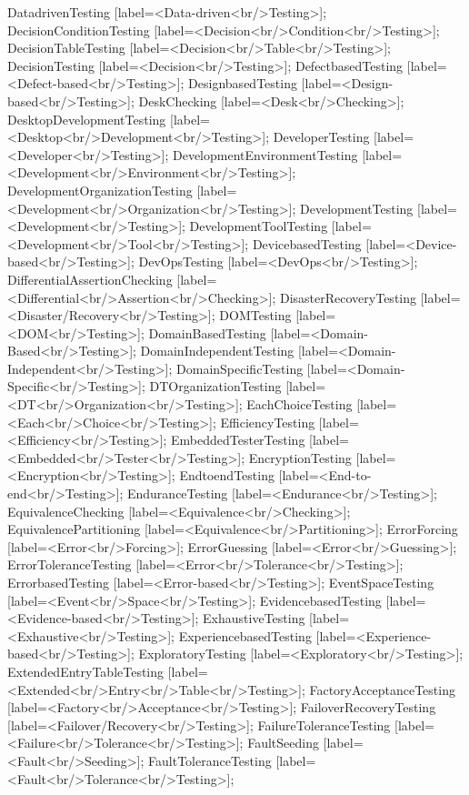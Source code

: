 \documentclass{article}
\begin{document}
{DatadrivenTesting [label=<Data-driven<br/>Testing>];
DecisionConditionTesting [label=<Decision<br/>Condition<br/>Testing>];
DecisionTableTesting [label=<Decision<br/>Table<br/>Testing>];
DecisionTesting [label=<Decision<br/>Testing>];
DefectbasedTesting [label=<Defect-based<br/>Testing>];
DesignbasedTesting [label=<Design-based<br/>Testing>];
DeskChecking [label=<Desk<br/>Checking>];
DesktopDevelopmentTesting [label=<Desktop<br/>Development<br/>Testing>];
DeveloperTesting [label=<Developer<br/>Testing>];
DevelopmentEnvironmentTesting [label=<Development<br/>Environment<br/>Testing>];
DevelopmentOrganizationTesting [label=<Development<br/>Organization<br/>Testing>];
DevelopmentTesting [label=<Development<br/>Testing>];
DevelopmentToolTesting [label=<Development<br/>Tool<br/>Testing>];
DevicebasedTesting [label=<Device-based<br/>Testing>];
DevOpsTesting [label=<DevOps<br/>Testing>];
DifferentialAssertionChecking [label=<Differential<br/>Assertion<br/>Checking>];
DisasterRecoveryTesting [label=<Disaster/Recovery<br/>Testing>];
DOMTesting [label=<DOM<br/>Testing>];
DomainBasedTesting [label=<Domain-Based<br/>Testing>];
DomainIndependentTesting [label=<Domain-Independent<br/>Testing>];
DomainSpecificTesting [label=<Domain-Specific<br/>Testing>];
DTOrganizationTesting [label=<DT<br/>Organization<br/>Testing>];
EachChoiceTesting [label=<Each<br/>Choice<br/>Testing>];
EfficiencyTesting [label=<Efficiency<br/>Testing>];
EmbeddedTesterTesting [label=<Embedded<br/>Tester<br/>Testing>];
EncryptionTesting [label=<Encryption<br/>Testing>];
EndtoendTesting [label=<End-to-end<br/>Testing>];
EnduranceTesting [label=<Endurance<br/>Testing>];
EquivalenceChecking [label=<Equivalence<br/>Checking>];
EquivalencePartitioning [label=<Equivalence<br/>Partitioning>];
ErrorForcing [label=<Error<br/>Forcing>];
ErrorGuessing [label=<Error<br/>Guessing>];
ErrorToleranceTesting [label=<Error<br/>Tolerance<br/>Testing>];
ErrorbasedTesting [label=<Error-based<br/>Testing>];
EventSpaceTesting [label=<Event<br/>Space<br/>Testing>];
EvidencebasedTesting [label=<Evidence-based<br/>Testing>];
ExhaustiveTesting [label=<Exhaustive<br/>Testing>];
ExperiencebasedTesting [label=<Experience-based<br/>Testing>];
ExploratoryTesting [label=<Exploratory<br/>Testing>];
ExtendedEntryTableTesting [label=<Extended<br/>Entry<br/>Table<br/>Testing>];
FactoryAcceptanceTesting [label=<Factory<br/>Acceptance<br/>Testing>];
FailoverRecoveryTesting [label=<Failover/Recovery<br/>Testing>];
FailureToleranceTesting [label=<Failure<br/>Tolerance<br/>Testing>];
FaultSeeding [label=<Fault<br/>Seeding>];
FaultToleranceTesting [label=<Fault<br/>Tolerance<br/>Testing>];
}
\end{document}
